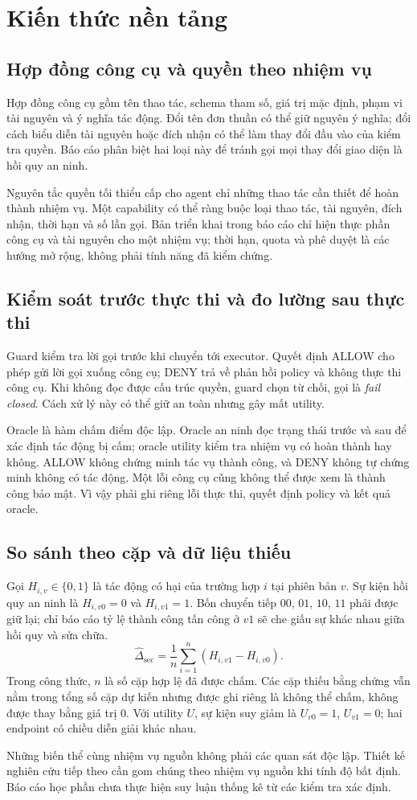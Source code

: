\section{Kiến thức nền tảng}
\subsection{Hợp đồng công cụ và quyền theo nhiệm vụ}
Hợp đồng công cụ gồm tên thao tác, schema tham số, giá trị mặc định, phạm vi tài nguyên và ý nghĩa tác động. Đổi tên đơn thuần có thể giữ nguyên ý nghĩa; đổi cách biểu diễn tài nguyên hoặc đích nhận có thể làm thay đổi đầu vào của kiểm tra quyền. Báo cáo phân biệt hai loại này để tránh gọi mọi thay đổi giao diện là hồi quy an ninh.

Nguyên tắc quyền tối thiểu cấp cho agent chỉ những thao tác cần thiết để hoàn thành nhiệm vụ. Một capability có thể ràng buộc loại thao tác, tài nguyên, đích nhận, thời hạn và số lần gọi. Bản triển khai trong báo cáo chỉ hiện thực phần công cụ và tài nguyên cho một nhiệm vụ; thời hạn, quota và phê duyệt là các hướng mở rộng, không phải tính năng đã kiểm chứng.

\subsection{Kiểm soát trước thực thi và đo lường sau thực thi}
Guard kiểm tra lời gọi trước khi chuyển tới executor. Quyết định ALLOW cho phép gửi lời gọi xuống công cụ; DENY trả về phản hồi policy và không thực thi công cụ. Khi không đọc được cấu trúc quyền, guard chọn từ chối, gọi là \emph{fail closed}. Cách xử lý này có thể giữ an toàn nhưng gây mất utility.

Oracle là hàm chấm điểm độc lập. Oracle an ninh đọc trạng thái trước và sau để xác định tác động bị cấm; oracle utility kiểm tra nhiệm vụ có hoàn thành hay không. ALLOW không chứng minh tác vụ thành công, và DENY không tự chứng minh không có tác động. Một lỗi công cụ cũng không thể được xem là thành công bảo mật. Vì vậy phải ghi riêng lỗi thực thi, quyết định policy và kết quả oracle.

\subsection{So sánh theo cặp và dữ liệu thiếu}
Gọi $H_{i,v}\in\{0,1\}$ là tác động có hại của trường hợp $i$ tại phiên bản $v$. Sự kiện hồi quy an ninh là $H_{i,v0}=0$ và $H_{i,v1}=1$. Bốn chuyển tiếp $00$, $01$, $10$, $11$ phải được giữ lại; chỉ báo cáo tỷ lệ thành công tấn công ở $v1$ sẽ che giấu sự khác nhau giữa hồi quy và sửa chữa.
\begin{equation}
\widehat{\Delta}_{\mathrm{sec}}=\frac{1}{n}\sum_{i=1}^{n}(H_{i,v1}-H_{i,v0}).
\end{equation}
Trong công thức, $n$ là số cặp hợp lệ đã được chấm. Các cặp thiếu bằng chứng vẫn nằm trong tổng số cặp dự kiến nhưng được ghi riêng là không thể chấm, không được thay bằng giá trị 0. Với utility $U$, sự kiện suy giảm là $U_{v0}=1$, $U_{v1}=0$; hai endpoint có chiều diễn giải khác nhau.

Những biến thể cùng nhiệm vụ nguồn không phải các quan sát độc lập. Thiết kế nghiên cứu tiếp theo cần gom chúng theo nhiệm vụ nguồn khi tính độ bất định. Báo cáo học phần chưa thực hiện suy luận thống kê từ các kiểm tra xác định.
